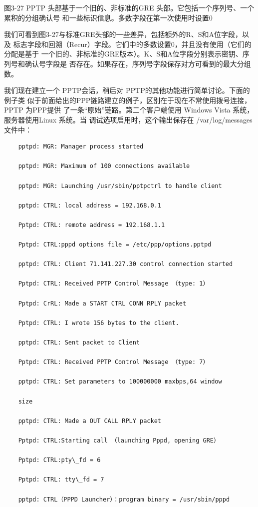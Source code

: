 图3-27 PPTP 头部基于一个旧的、非标准的GRE 头部。它包括一个序列号、一个累积的分组确认号
和一些标识信息。多数字段在第一次使用时设置0

我们可看到图3-27与标准GRE头部的一些差异，包括额外的R、S和A位字段，以及
标志字段和回溯（Recur）字段。它们中的多数设置0，并且没有使用（它们的分配是基于
一个旧的、非标准的GRE版本）。K、S和A位字段分别表示密钥、序列号和确认号字段是
否存在。如果存在，序列号字段保存对方可看到的最大分组数。

我们现在建立一个 PPTP会话，稍后对 PPTP的其他功能进行简单讨论。下面的例子类
似于前面给出的PPP链路建立的例子，区别在于现在不常使用拨号连接，PPTP 为PPP提供
了一条“原始”链路。第二个客户端使用 Windows Vista 系统，服务器使用Linux 系统。当
调试选项启用时，这个输出保存在 /var/log/messages 文件中：

\begin{verbatim}
    pptpd: MGR: Manager process started
    
    pptpd: MGR: Maximum of 100 connections available
    
    pptpd: MGR: Launching /usr/sbin/pptpctrl to handle client
    
    pptpd: CTRL: local address = 192.168.0.1
    
    Pptpd: CTRL: remote address = 192.168.1.1
    
    Pptpd: CTRL:pppd options file = /etc/ppp/options.pptpd
    
    pptpd: CTRL: Client 71.141.227.30 control connection started
    
    Pptpd: CTRL: Received PPTP Control Message （type: 1）
    
    Pptpd: CrRL: Made a START CTRL CONN RPLY packet
    
    Pptpd: CTRL: I wrote 156 bytes to the client.
    
    pptpd: CTRL: Sent packet to Client
    
    Pptpd: CTRL: Received PPTP Control Message （type: 7）
    
    pptpd: CTRL: Set parameters to 100000000 maxbps,64 window
    
    size
    
    pptpd: CTRL: Made a OUT CALL RPLY packet
    
    Pptpd: CTRL:Starting call （launching Pppd, opening GRE）
    
    Pptpd: CTRL:pty\_fd = 6
    
    Pptpd: CTRL: tty\_fd = 7
    
    pptpd: CTRL（PPPD Launcher）：program binary = /usr/sbin/pppd
    

\end{verbatim}
